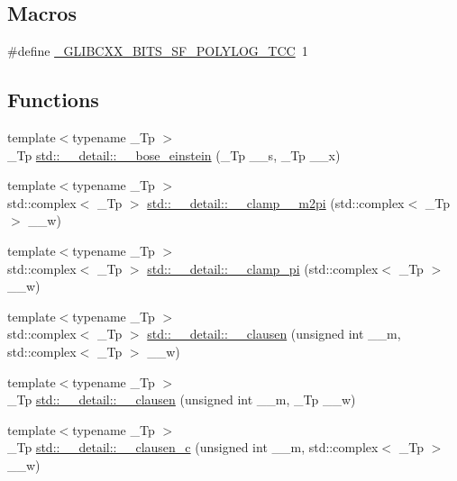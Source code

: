 \subsection*{Macros}
\begin{DoxyCompactItemize}
\item 
\#define \hyperlink{sf__polylog_8tcc_ab6c10ff949c404f48f72645a3fe8a674}{\+\_\+\+G\+L\+I\+B\+C\+X\+X\+\_\+\+B\+I\+T\+S\+\_\+\+S\+F\+\_\+\+P\+O\+L\+Y\+L\+O\+G\+\_\+\+T\+CC}~1
\end{DoxyCompactItemize}
\subsection*{Functions}
\begin{DoxyCompactItemize}
\item 
{\footnotesize template$<$typename \+\_\+\+Tp $>$ }\\\+\_\+\+Tp \hyperlink{namespacestd_1_1____detail_a4c199ebf92e53a3ae9c27c2c79d65e21}{std\+::\+\_\+\+\_\+detail\+::\+\_\+\+\_\+bose\+\_\+einstein} (\+\_\+\+Tp \+\_\+\+\_\+s, \+\_\+\+Tp \+\_\+\+\_\+x)
\item 
{\footnotesize template$<$typename \+\_\+\+Tp $>$ }\\std\+::complex$<$ \+\_\+\+Tp $>$ \hyperlink{namespacestd_1_1____detail_a49702394cf9b45acfa5b84f232078a9b}{std\+::\+\_\+\+\_\+detail\+::\+\_\+\+\_\+clamp\+\_\+\_\+m2pi} (std\+::complex$<$ \+\_\+\+Tp $>$ \+\_\+\+\_\+w)
\item 
{\footnotesize template$<$typename \+\_\+\+Tp $>$ }\\std\+::complex$<$ \+\_\+\+Tp $>$ \hyperlink{namespacestd_1_1____detail_afc1fa8ae4623bdc71b3bf21671f68e38}{std\+::\+\_\+\+\_\+detail\+::\+\_\+\+\_\+clamp\+\_\+pi} (std\+::complex$<$ \+\_\+\+Tp $>$ \+\_\+\+\_\+w)
\item 
{\footnotesize template$<$typename \+\_\+\+Tp $>$ }\\std\+::complex$<$ \+\_\+\+Tp $>$ \hyperlink{namespacestd_1_1____detail_a260f2c50d0164a55dab6a95217ced893}{std\+::\+\_\+\+\_\+detail\+::\+\_\+\+\_\+clausen} (unsigned int \+\_\+\+\_\+m, std\+::complex$<$ \+\_\+\+Tp $>$ \+\_\+\+\_\+w)
\item 
{\footnotesize template$<$typename \+\_\+\+Tp $>$ }\\\+\_\+\+Tp \hyperlink{namespacestd_1_1____detail_a12dab8bfc7bc5554fe0db5d1777d9887}{std\+::\+\_\+\+\_\+detail\+::\+\_\+\+\_\+clausen} (unsigned int \+\_\+\+\_\+m, \+\_\+\+Tp \+\_\+\+\_\+w)
\item 
{\footnotesize template$<$typename \+\_\+\+Tp $>$ }\\\+\_\+\+Tp \hyperlink{namespacestd_1_1____detail_a06b95eeefe47e8899e2e0a6bbd3ad31b}{std\+::\+\_\+\+\_\+detail\+::\+\_\+\+\_\+clausen\+\_\+c} (unsigned int \+\_\+\+\_\+m, std\+::complex$<$ \+\_\+\+Tp $>$ \+\_\+\+\_\+w)

\end{DoxyCompactItemize}

